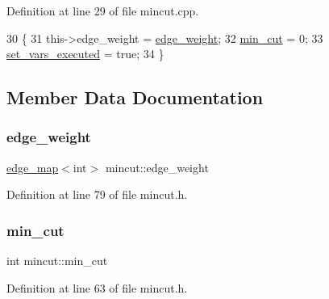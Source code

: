 Definition at line 29 of file mincut.\+cpp.


\begin{DoxyCode}
30 \{
31     this->edge\_weight = \mbox{\hyperlink{classmincut_a080162552b5350b4e42228c9d536904e}{edge\_weight}};
32     \mbox{\hyperlink{classmincut_a0d7cc01f8dd8b09c58dfb08c1123415f}{min\_cut}} = 0;
33     \mbox{\hyperlink{classmincut_adeef2b186f863ce70809a6731f09de04}{set\_vars\_executed}} = \textcolor{keyword}{true};
34 \}
\end{DoxyCode}


\subsection{Member Data Documentation}
\mbox{\label{classmincut_a080162552b5350b4e42228c9d536904e}} 
\subsubsection{\texorpdfstring{edge\+\_\+weight}{edge\_weight}}
{\footnotesize\ttfamily \mbox{\hyperlink{classedge__map}{edge\+\_\+map}}$<$int$>$ mincut\+::edge\+\_\+weight\hspace{0.3cm}{\ttfamily [protected]}}



Definition at line 79 of file mincut.\+h.

\mbox{\label{classmincut_a0d7cc01f8dd8b09c58dfb08c1123415f}} 
\subsubsection{\texorpdfstring{min\+\_\+cut}{min\_cut}}
{\footnotesize\ttfamily int mincut\+::min\+\_\+cut\hspace{0.3cm}{\ttfamily [protected]}}



Definition at line 63 of file mincut.\+h.

\mbox{\label{classmincut_adeef2b186f863ce70809a6731f09de04}} 
